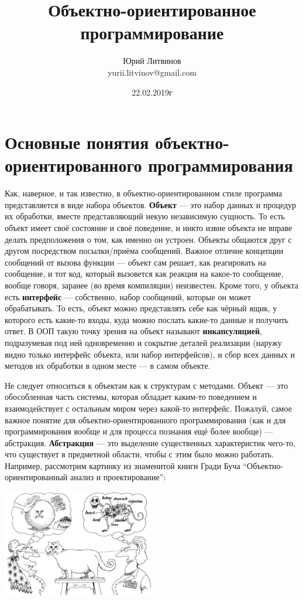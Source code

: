 \documentclass[a5paper]{article}
\title{Объектно-ориентированное программирование}
\author{Юрий Литвинов\\\small{yurii.litvinov@gmail.com}}
\date{22.02.2019г}
\begin{document}
\maketitle
\thispagestyle{empty}

\section{Основные понятия объектно-ориентированного программирования}

Как, наверное, и так известно, в объектно-ориентированном стиле программа представляется в виде набора объектов. \textbf{Объект} --- это набор данных и процедур их обработки, вместе представляющий некую независимую сущность. То есть объект имеет своё состояние и своё поведение, и никто извне объекта не вправе делать предположения о том, как именно он устроен. Объекты общаются друг с другом посредством посылки/приёма сообщений. Важное отличие концепции сообщений от вызова функции --- объект сам решает, как реагировать на сообщение, и тот код, который вызовется как реакция на какое-то сообщение, вообще говоря, заранее (во время компиляции) неизвестен. Кроме того, у объекта есть \textbf{интерфейс} --- собственно, набор сообщений, которые он может обрабатывать. То есть, объект можно представлять себе как чёрный ящик, у которого есть какие-то входы, куда можно послать какие-то данные и получить ответ. В ООП такую точку зрения на объект называют \textbf{инкапсуляцией}, подразумевая под ней одновременно и сокрытие деталей реализации (наружу видно только интерфейс объекта, или набор интерфейсов), и сбор всех данных и методов их обработки в одном месте --- в самом объекте.

Не следует относиться к объектам как к структурам с методами. Объект --- это обособленная часть системы, которая обладает каким-то поведением и взаимодействует с остальным миром через какой-то интерфейс. Пожалуй, самое важное понятие для объектно-ориентированного программирования (как и для программирования вообще и для процесса познания ещё более вообще) --- абстракция. \textbf{Абстракция} --- это выделение существенных характеристик чего-то, что существует в предметной области, чтобы с этим было можно работать. Например, рассмотрим картинку из знаменитой книги Гради Буча ``Объектно-ориентированный анализ и проектирование'':

\begin{center}
	\includegraphics[width=0.5\textwidth]{abstraction.png}
\end{center}
\end{document}
